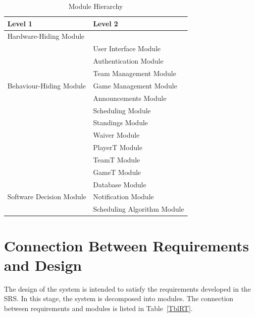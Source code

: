 \documentclass[12pt, titlepage]{article}
\begin{document}
\begin{table}[h!]
\centering
\begin{tabular}{p{} p{}}
\toprule
\textbf{Level 1} & \textbf{Level 2}\\
\midrule

{Hardware-Hiding Module} & ~ \\
\midrule

\multirow{7}{0.3\textwidth}{Behaviour-Hiding Module} & User Interface Module\\
& Authentication Module\\
& Team Management Module\\
& Game Management Module\\
& Announcements Module\\
& Scheduling Module\\
& Standings Module\\
& Waiver Module\\
& PlayerT Module\\
& TeamT Module\\
& GameT Module\\
\midrule

\multirow{3}{0.3\textwidth}{Software Decision Module} & {Database Module}\\
& {Notification Module}\\
& {Scheduling Algorithm Module}\\
\bottomrule

\end{tabular}
\caption{Module Hierarchy}
\label{TblMH}
\end{table}

\section{Connection Between Requirements and Design} \label{SecConnection}

The design of the system is intended to satisfy the requirements developed in
the SRS. In this stage, the system is decomposed into modules. The connection
between requirements and modules is listed in Table~\ref{TblRT}.

\end{document}
